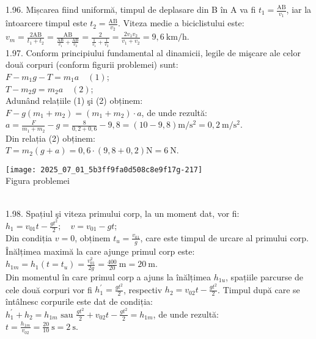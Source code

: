 1.96. Mișcarea fiind uniformă, timpul de deplasare din B în A va fi $t_{1}=\frac{\mathrm{AB}}{v_{1}}$, iar la întoarcere timpul este $t_{2}=\frac{\mathrm{AB}}{v_{2}}$. Viteza medie a biciclistului este:\\ $v_{m}=\frac{2 \mathrm{AB}}{t_{1}+t_{2}}=\frac{\mathrm{AB}}{\frac{\mathrm{AB}}{v_{1}}+\frac{\mathrm{AB}}{v_{2}}}=\frac{2}{\frac{1}{v_{1}}+\frac{1}{v_{2}}}=\frac{2 v_{1} v_{2}}{v_{1}+v_{2}}=9,6 \mathrm{~km} / \mathrm{h}$.\\

1.97. Conform principiului fundamental al dinamicii, legile de mişcare ale celor două corpuri (conform figurii problemei) sunt:\\ $F-m_{1} g-T=m_{1} a \quad (1)$;\\ $T-m_{2} g=m_{2} a \quad (2)$;\\ Adunând relațiile (1) şi (2) obținem:\\ $F-g\left(m_{1}+m_{2}\right)=\left(m_{1}+m_{2}\right) \cdot a$, de unde rezultă:\\ $a=\frac{F}{m_{1}+m_{2}}-g=\frac{8}{0,2+0,6}-9,8=(10-9,8) \mathrm{m} / \mathrm{s}^{2}=0,2 \mathrm{~m} / \mathrm{s}^{2}$.\\ Din relația (2) obținem:\\ $T=m_{2}(g+a)=0,6 \cdot(9,8+0,2) \mathrm{N}=6 \mathrm{~N}$.\\ \begin{center} \texttt{[image: 2025\_07\_01\_5b3ff9fa0d508c8e9f17g-217]}\\ Figura problemei \end{center}\\

1.98. Spațiul şi viteza primului corp, la un moment dat, vor fi:\\ $h_{1}=v_{01} t-\frac{g t^{2}}{2}; \quad v=v_{01}-g t$;\\ Din condiția $v=0$, obținem $t_{u}=\frac{v_{01}}{g}$, care este timpul de urcare al primului corp. Înălțimea maximă la care ajunge primul corp este:\\ $h_{1 m}=h_{1}\left(t=t_{u}\right)=\frac{v_{01}^{2}}{2 g}=\frac{400}{20} \mathrm{~m}=20 \mathrm{~m}$.\\ Din momentul în care primul corp a ajuns la înălțimea $h_{1 u}$, spațiile parcurse de cele două corpuri vor fi $h_{1}^{\prime}=\frac{g t^{2}}{2}$, respectiv $h_{2}=v_{02} t-\frac{g t^{2}}{2}$. Timpul după care se întâlnesc corpurile este dat de condiția:\\ $h_{1}^{\prime}+h_{2}=h_{1 m} \text { sau } \frac{g t^{2}}{2}+v_{02} t-\frac{g t^{2}}{2}=h_{1 m}$, de unde rezultă:\\ $t=\frac{h_{1 m}}{v_{02}}=\frac{20}{10} \mathrm{~s}=2 \mathrm{~s}$.\\

